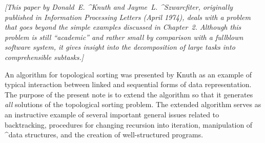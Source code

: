 
\def\chaptertitle{A Structured Program for Topological Sorting (1974)}

\begingroup

\def\K{\mathrel{:=}}
\def\C#1{{%
\advance\ind by-2\hangindent\ind em\noindent\&{comment} #1\par\advance\ind by2}}
\def\rlab#1{#1}     %
\def\lab#1{\\{#1}}  %

%
%
%
%
%
%
%
\vskip12pt  %
\noindent
{\sl%
[This paper by Donald~E. ^{Knuth} and Jayme~L. ^{Szwarcfiter}, originally
published in {\sl Information Processing Letters} (April 1974), deals
with a problem that goes beyond the simple examples discussed in Chapter~2.
Although this problem is still ``academic'' and rather small by comparison
with a fullblown software system, it gives insight into the decomposition
of large tasks into comprehensible subtasks.]}
\bigskip

\noindent
An
algorithm for topological sorting was presented by Knuth\cite{4} as an
example of typical interaction between linked and sequential forms of
data representation. The purpose of the present note is to extend the
algorithm so that it generates {\em all\/} solutions of the topological
sorting problem. The extended algorithm serves as an instructive
example of several important general issues related to backtracking,
procedures for changing recursion into iteration, manipulation of
^{data structures}, and the creation of well-structured programs.

